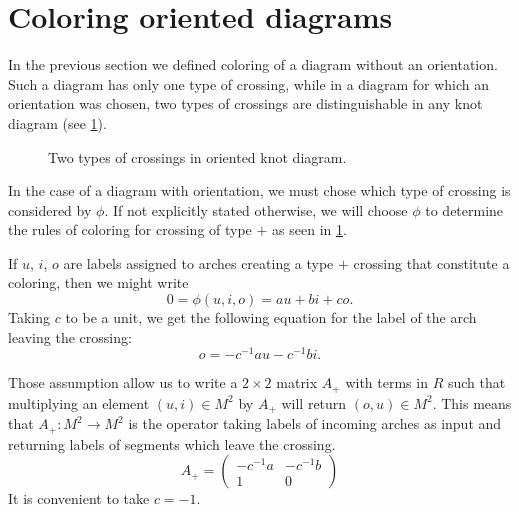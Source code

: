 \section{Coloring oriented diagrams}

In the previous section we defined coloring of a diagram without an orientation. Such a diagram has only one type of crossing, while in a diagram for which an orientation was chosen, two types of crossings are distinguishable in any knot diagram (see \cref{fig two crossings}).

\begin{figure}[h]\centering 
    \caption{\label{fig two crossings} Two types of crossings in oriented knot diagram.}
\end{figure}

In the case of a diagram with orientation, we must chose which type of crossing is considered by $\phi$. If not explicitly stated otherwise, we will choose $\phi$ to determine the rules of coloring for crossing of type $+$ as seen in \cref{fig two crossings}. 

If $u$, $i$, $o$ are labels assigned to arches creating a type $+$ crossing that constitute a coloring, then we might write 
$$0=\phi(u, i, o)=au+bi+co.$$
Taking $c$ to be a unit, we get the following equation for the label of the arch leaving the crossing:
$$o=-c^{-1}au-c^{-1}bi.$$

Those assumption allow us to write a $2\times 2$ matrix $A_+$ with terms in $R$ such that multiplying an element $(u, i)\in M^2$ by $A_+$ will return $(o, u)\in M^2$. This means that $A_+:M^2\to M^2$ is the operator taking labels of incoming arches as input and returning labels of segments which leave the crossing.
$$
A_+=\begin{pmatrix}
  -c^{-1}a & -c^{-1}b \\ 
  1 & 0
\end{pmatrix}
$$
It is convenient to take $c=-1$.

